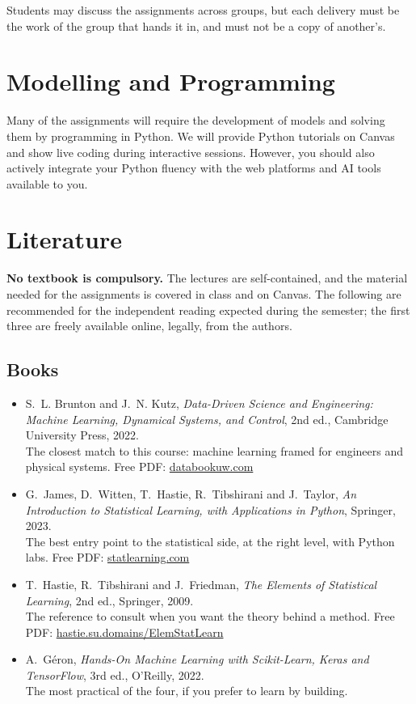 \documentclass[letterpaper,12pt,oneside]{article}
\begin{document}
Students may discuss the assignments across groups, but each delivery must be the work of the group that hands it in, and must not be a copy of another's.


\section*{Modelling and Programming}

Many of the assignments will require the development of models and solving them by programming in Python. We will provide Python tutorials on Canvas and show live coding during interactive sessions. However, you should also actively integrate your Python fluency with the web platforms and AI tools available to you.


\section*{Literature}

\textbf{No textbook is compulsory.} The lectures are self-contained, and the material needed for the assignments is covered in class and on Canvas. The following are recommended for the independent reading expected during the semester; the first three are freely available online, legally, from the authors.

\subsection*{Books}

\begin{itemize}
\item S.~L. Brunton and J.~N. Kutz, \textit{Data-Driven Science and Engineering: Machine Learning, Dynamical Systems, and Control}, 2nd ed., Cambridge University Press, 2022. \\ The closest match to this course: machine learning framed for engineers and physical systems. Free PDF: \href{https://databookuw.com/}{databookuw.com}
\item G.~James, D.~Witten, T.~Hastie, R.~Tibshirani and J.~Taylor, \textit{An Introduction to Statistical Learning, with Applications in Python}, Springer, 2023. \\ The best entry point to the statistical side, at the right level, with Python labs. Free PDF: \href{https://www.statlearning.com/}{statlearning.com}
\item T.~Hastie, R.~Tibshirani and J.~Friedman, \textit{The Elements of Statistical Learning}, 2nd ed., Springer, 2009. \\ The reference to consult when you want the theory behind a method. Free PDF: \href{https://hastie.su.domains/ElemStatLearn/}{hastie.su.domains/ElemStatLearn}
\item A.~G\'eron, \textit{Hands-On Machine Learning with Scikit-Learn, Keras and TensorFlow}, 3rd ed., O'Reilly, 2022. \\ The most practical of the four, if you prefer to learn by building.
\end{itemize}
\end{document}
